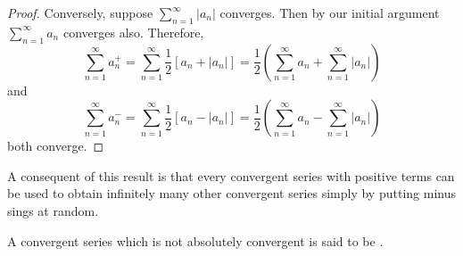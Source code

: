 \documentclass[12pt, a4paper, oneside, openright, titlepage]{book}
\begin{document}
\begin{proof}
    Conversely, suppose $\sum\limits_{n=1}^{\infty}|a_n|$ converges. Then by our initial argument $\sum\limits_{n=1}^{\infty}a_n$ converges also. Therefore, \begin{equation*}
        \sum\limits_{n=1}^{\infty}a_n^+ = \sum\limits_{n=1}^{\infty}\frac{1}{2}[a_n + |a_n|] = \frac{1}{2}\left(\sum\limits_{n=1}^{\infty}a_n + \sum\limits_{n=1}^{\infty}|a_n|\right)
    \end{equation*}
    and  \begin{equation*}
        \sum\limits_{n=1}^{\infty}a_n^- = \sum\limits_{n=1}^{\infty}\frac{1}{2}[a_n - |a_n|] = \frac{1}{2}\left(\sum\limits_{n=1}^{\infty}a_n - \sum\limits_{n=1}^{\infty}|a_n|\right)
    \end{equation*}
    both converge.
\end{proof}



\begin{rmk}
    A consequent of this result is that every convergent series with positive terms can be used to obtain infinitely many other convergent series simply by putting minus sings at random.
\end{rmk}

\begin{defn}
    A convergent series which is not absolutely convergent is said to be .
\end{defn}
\end{document}
